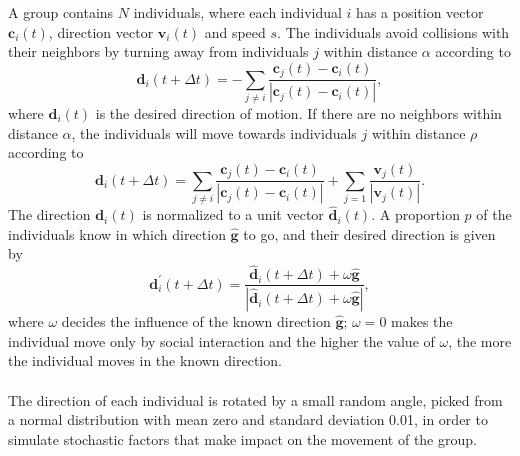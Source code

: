 A group contains $N$ individuals, where each individual $i$ has a position vector $\boldsymbol{c}_i(t)$, direction vector $\boldsymbol{v}_i(t)$ and speed $s$. 
The individuals avoid collisions with their neighbors by turning away from individuals $j$ within distance $\alpha$ according to
\begin{equation}
\boldsymbol{d}_i (t+\Delta t) = - \sum_{j \neq i} \frac{\boldsymbol{c}_j (t) - \boldsymbol{c}_i (t)}{|\boldsymbol{c}_j (t) - \boldsymbol{c}_i (t) |},
\label{eq:repulsion}
\end{equation}
where $\boldsymbol{d}_i(t)$ is the desired direction of motion. 
If there are no neighbors within distance $\alpha$, the individuals will move towards individuals $j$ within distance $\rho$ according to
\begin{equation}
\boldsymbol{d}_i (t+\Delta t) = \sum_{j \neq i} \frac{\boldsymbol{c}_j (t)- \boldsymbol{c}_i (t)}{|\boldsymbol{c}_j (t) - \boldsymbol{c}_i (t)|} + \sum_{j = 1} \frac{\boldsymbol{v}_j (t)}{|\boldsymbol{v}_j (t)|}.
\label{eq:attraction}
\end{equation}
The direction $\boldsymbol{d}_i(t)$ is normalized to a unit vector $\hat{\boldsymbol{d}}_i(t)$. 
A proportion $p$ of the individuals know in which direction $\hat{\boldsymbol{g}}$ to go, and their desired direction is given by
\begin{equation}
\boldsymbol{d}_i^\prime (t+\Delta t) = \frac{\hat{\boldsymbol{d}}_i (t+\Delta t) + \omega \hat{\boldsymbol{g}}}{|\hat{\boldsymbol{d}}_i (t+\Delta t) + \omega \hat{\boldsymbol{g}}|},
\label{eq:attraction}
\end{equation}
where $\omega$ decides the influence of the known direction $\hat{\boldsymbol{g}}$; $\omega=0$ makes the individual move only by social interaction and the higher the value of $\omega$, the more the individual moves in the known direction.
\\\\
The direction of each individual is rotated by a small random angle, picked from a normal distribution with mean zero and standard deviation 0.01, in order to simulate stochastic factors that make impact on the movement of the group. 


